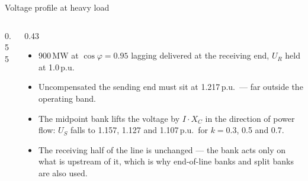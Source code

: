 \begin{frame}{Voltage profile at heavy load}
  \begin{columns}[c,onlytextwidth]
    \begin{column}{0.55\textwidth}\centering
    \end{column}
    \begin{column}{0.43\textwidth}
      {\small
      \begin{itemize}
        \setlength{\itemsep}{0.4em}
        \item 900\,MW at $\cos\varphi=0.95$ lagging delivered at the receiving
              end, $U_R$ held at 1.0\,p.u.
        \item Uncompensated the sending end must sit at 1.217\,p.u.\ ---
              far outside the operating band.
        \item The midpoint bank lifts the voltage by $I\cdot X_C$ in the
              direction of power flow: $U_S$ falls to 1.157, 1.127 and
              1.107\,p.u.\ for $k=0.3$, 0.5 and 0.7.
        \item The receiving half of the line is unchanged --- the bank acts
              only on what is upstream of it, which is why end-of-line
              banks and split banks are also used.
      \end{itemize}}
    \end{column}
  \end{columns}
\end{frame}

